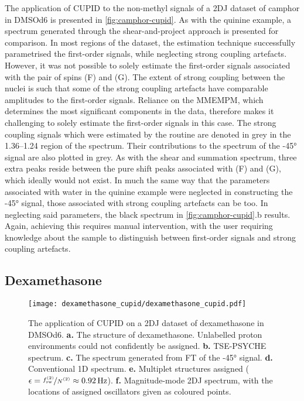 The application of \ac{CUPID} to the non-methyl signals of a \ac{2DJ}
dataset of camphor in \acs{DMSOd6} is presented
in \cref{fig:camphor-cupid}. As with the quinine example, a spectrum
generated through the shear-and-project approach is presented for
comparison. In most regions of the dataset, the estimation technique
successfully parametrised the first-order signals, while neglecting strong
coupling artefacts. However, it was not possible to solely estimate the
first-order signals associated with the pair of spins (F) and (G). The extent
of strong coupling between the nuclei is such that some of the strong coupling
artefacts have comparable amplitudes to the first-order signals. Reliance on
the
\ac{MMEMPM}, which determines the most significant components in
the data, therefore makes it challenging to solely estimate the first-order
signals in this case. The strong coupling signals which were estimated by the
routine are denoted in grey in the \SIrange{1.36}{1.24}{\partspermillion} region
of the spectrum. Their contributions to the spectrum of the \ang{-45} signal
are also plotted in grey. As with the shear and summation spectrum, three extra
peaks reside between the pure shift peaks associated with (F) and (G), which
ideally would not exist. In much the same way that the parameters associated
with water in the quinine example were neglected in constructing the \ang{-45}
signal, those associated with strong coupling artefacts can be too.
In neglecting said parameters, the black spectrum in \cref{fig:camphor-cupid}.b
results. Again, achieving this requires manual intervention, with the user
requiring knowledge about the sample to distinguish between first-order signals
and strong coupling artefacts.

\subsection{Dexamethasone}
\begin{figure}%
    \centering%
    \texttt{[image: dexamethasone\_cupid/dexamethasone\_cupid.pdf]}%
    \caption[
        The application of \acs{CUPID} on a dexamethasone \acs{2DJ} dataset.
    ]{
        The application of \acs{CUPID} on a \ac{2DJ} dataset of dexamethasone in
        \acs{DMSOd6}.
        \textbf{a.} The structure of dexamethasone. Unlabelled proton
        environments could not confidently be assigned.
        \textbf{b.} \acs{TSE-PSYCHE} spectrum.
        \textbf{c.} The spectrum generated from \ac{FT} of the \ang{-45}
        signal.
        \textbf{d.} Conventional \acs{1D} spectrum.
        \textbf{e.} Multiplet structures assigned ($\epsilon =
        \nicefrac{\fswtwo}{\Ntwo} \approx \qty{0.92}{\hertz}$).
        \textbf{f.} Magnitude-mode \acs{2DJ} spectrum, with the locations of
        assigned oscillators given as coloured points.
    }
    \label{fig:dexamethasone-cupid}%
\end{figure}%

